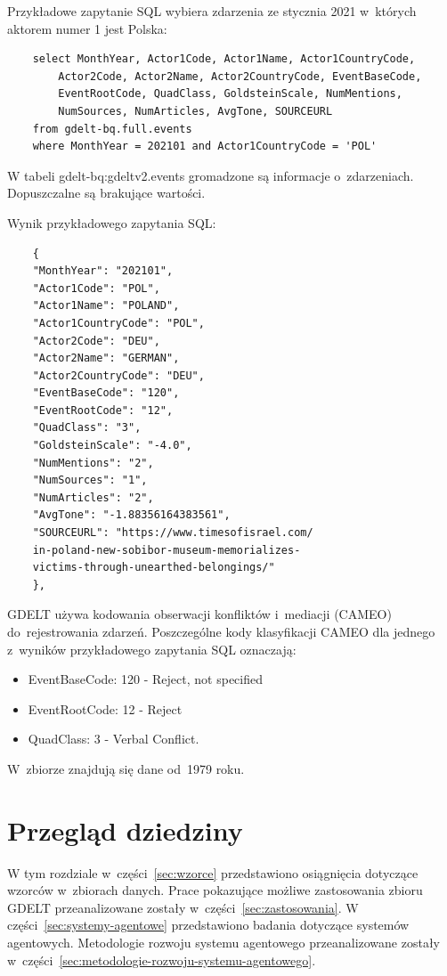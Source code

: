 \documentclass[11pt]{report}
\begin{document}
    Przykładowe zapytanie SQL wybiera zdarzenia ze stycznia 2021 w~których aktorem numer 1 jest Polska:

    \begin{verbatim}
    select MonthYear, Actor1Code, Actor1Name, Actor1CountryCode,
        Actor2Code, Actor2Name, Actor2CountryCode, EventBaseCode,
        EventRootCode, QuadClass, GoldsteinScale, NumMentions,
        NumSources, NumArticles, AvgTone, SOURCEURL
    from gdelt-bq.full.events
    where MonthYear = 202101 and Actor1CountryCode = 'POL'
    \end{verbatim}

    W tabeli gdelt-bq:gdeltv2.events gromadzone są informacje o~zdarzeniach.
    Dopuszczalne są brakujące wartości.

    Wynik przykładowego zapytania SQL:~\begin{verbatim}
    {
    "MonthYear": "202101",
    "Actor1Code": "POL",
    "Actor1Name": "POLAND",
    "Actor1CountryCode": "POL",
    "Actor2Code": "DEU",
    "Actor2Name": "GERMAN",
    "Actor2CountryCode": "DEU",
    "EventBaseCode": "120",
    "EventRootCode": "12",
    "QuadClass": "3",
    "GoldsteinScale": "-4.0",
    "NumMentions": "2",
    "NumSources": "1",
    "NumArticles": "2",
    "AvgTone": "-1.88356164383561",
    "SOURCEURL": "https://www.timesofisrael.com/
    in-poland-new-sobibor-museum-memorializes-
    victims-through-unearthed-belongings/"
    },
    \end{verbatim}

    GDELT używa kodowania obserwacji konfliktów i~mediacji (CAMEO) do~rejestrowania zdarzeń.
    Poszczególne kody klasyfikacji CAMEO dla jednego z~wyników przykładowego zapytania SQL oznaczają:
    \begin{itemize}
        \item EventBaseCode: 120 - Reject, not specified
        \item EventRootCode: 12 - Reject
        \item QuadClass: 3 - Verbal Conflict.
    \end{itemize}

    W~zbiorze znajdują się dane od~1979 roku.


    \chapter{Przegląd dziedziny}\label{ch:przegląd-dziedziny}
    W tym rozdziale w~części~\ref{sec:wzorce} przedstawiono osiągnięcia dotyczące wzorców w~zbiorach danych.
    Prace pokazujące możliwe zastosowania zbioru GDELT przeanalizowane zostały w~części~\ref{sec:zastosowania}.
    W części~\ref{sec:systemy-agentowe} przedstawiono badania dotyczące systemów agentowych.
    Metodologie rozwoju systemu agentowego przeanalizowane zostały w~części~\ref{sec:metodologie-rozwoju-systemu-agentowego}.
\end{document}
